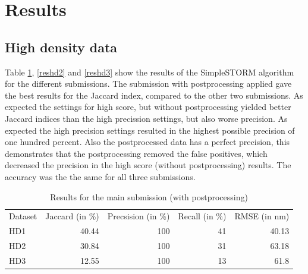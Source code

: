 \section{Results}
\subsection{High density data}
Table \ref{reshd1}, \ref{reshd2} and \ref{reshd3} show the results of the SimpleSTORM algorithm for the different submissions. The submission with postprocessing applied gave the best results for the Jaccard index, compared to the other two submissions. As expected the settings for high score, but without postprocessing yielded better Jaccard indices than the high precission settings, but also worse precision. As expected the high precision settings resulted in the highest possible precision of one hundred percent. Also the postprocessed data has a perfect precision, this demonstrates that the postprocessing removed the false positives, which decreased the precision in the high score (without postprocessing) results. The accuracy was the the same for all three submissions.\newline

\begin{table}
\caption{Results for the main submission (with postprocessing)}
\begin{tabular}{lrrrr}
Dataset&Jaccard (in \%)&Precsision (in \%)& Recall (in \%) & RMSE (in nm)\\
HD1&40.44&100&41&40.13\\
HD2&30.84&100&31&63.18\\
HD3&12.55&100&13&61.8
\end{tabular} \label{reshd1}
\end{table}


